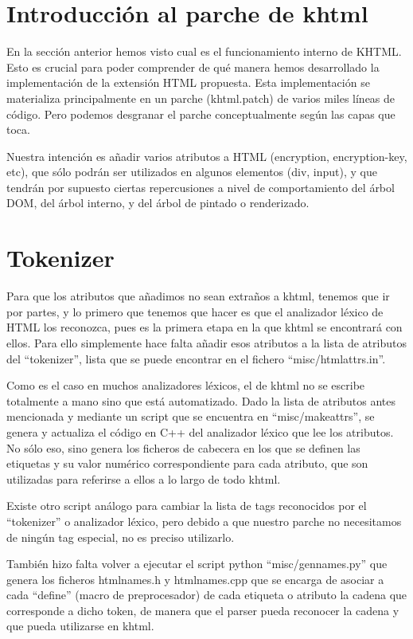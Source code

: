 \section{Introducción al parche de khtml}\label{khtml_patch_intro}

En la sección anterior hemos visto cual es el funcionamiento interno de KHTML. Esto es crucial para poder comprender de qué manera hemos desarrollado la implementación de la extensión HTML propuesta. Esta implementación se materializa principalmente en un parche (khtml.patch) de varios miles líneas de código. Pero podemos desgranar el parche conceptualmente según las capas que toca. 

Nuestra intención es añadir varios atributos a HTML (encryption, encryption-key, etc), que sólo podrán ser utilizados en algunos elementos (div, input), y que tendrán por supuesto ciertas repercusiones a nivel de comportamiento del árbol DOM, del árbol interno, y del árbol de pintado o renderizado.

\section{Tokenizer}\label{khtml_patch_tokenizer}

Para que los atributos que añadimos no sean extraños a khtml, tenemos que ir por partes, y lo primero que tenemos que hacer es que el analizador léxico de HTML los reconozca, pues es la primera etapa en la que khtml se encontrará con ellos. Para ello simplemente hace falta añadir esos atributos a la lista de atributos del ``tokenizer'', lista que se puede encontrar en el fichero ``misc/htmlattrs.in''.

Como es el caso en muchos analizadores léxicos, el de khtml no se escribe totalmente a mano sino que está automatizado. Dado la lista de atributos antes mencionada y mediante un script que se encuentra en ``misc/makeattrs'', se genera y actualiza el código en C++ del analizador léxico que lee los atributos. No sólo eso, sino genera los ficheros de cabecera en los que se definen las etiquetas y su valor numérico correspondiente para cada atributo, que son utilizadas para referirse a ellos a lo largo de todo khtml. 

Existe otro script análogo para cambiar la lista de tags reconocidos por el ``tokenizer'' o analizador léxico, pero debido a que nuestro parche no necesitamos de ningún tag especial, no es preciso utilizarlo.

También hizo falta volver a ejecutar el script python ``misc/gennames.py'' que genera los ficheros htmlnames.h y htmlnames.cpp que se encarga de asociar a cada ``define'' (macro de preprocesador) de cada etiqueta o atributo la cadena que corresponde a dicho token, de manera que el parser pueda reconocer la cadena y que pueda utilizarse en khtml.

